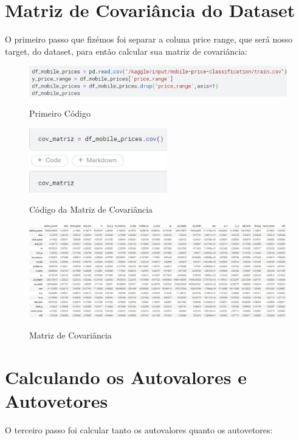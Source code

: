 \documentclass{report}
\begin{document}
\section{Matriz de Covariância do Dataset}
O primeiro passo que fizémos foi separar a coluna price range, que será nosso target, do dataset, para então calcular sua matriz de covariância:

\begin{figure}[htbp]
\caption{Primeiro Código}
\includegraphics[width=12cm]
{figures/primeiro_codigo.jpg}
\label{figura com o primeiro código que foi feito}
\end{figure}

\begin{figure}[htbp]
\centering
\caption{Código da Matriz de Covariância}
\includegraphics[width=6cm]
{figures/cod_matriz.jpg}
\label{figura com o código da matriz de covariância}
\end{figure}

\begin{figure}[htbp]
\centering
\caption{Matriz de Covariância}
\includegraphics[width=13cm]
{figures/matriz_cov.jpg}
\label{figura com a matriz de covariância}
\end{figure}

\section{Calculando os Autovalores e Autovetores}
O terceiro passo foi calcular tanto os autovalores quanto os autovetores:
\end{document}
